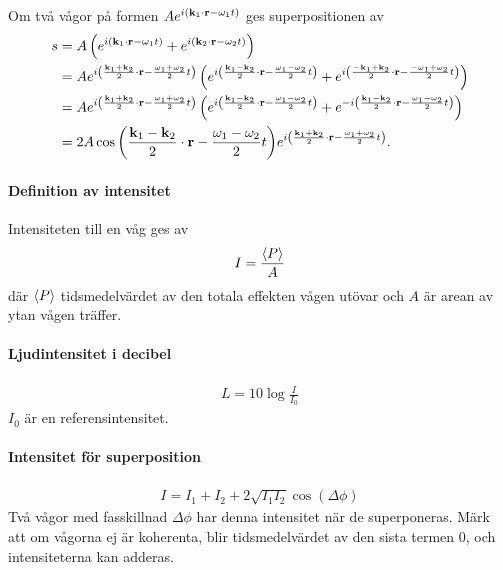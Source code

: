 \deriv
Om två vågor på formen $Ae^{i(\vect{k}_{1}\cdot\vect{r} - \omega_{1} t)}$ ges superpositionen av
\begin{align*}
	s &= A\left(e^{i(\vect{k}_{1}\cdot\vect{r} - \omega_{1} t)} + e^{i(\vect{k}_{2}\cdot\vect{r} - \omega_{2} t)}\right) \\
	  &= Ae^{i\left(\frac{\vect{k}_{1} + \vect{k}_{2}}{2}\cdot\vect{r} - \frac{\omega_{1} + \omega_{2}}{2}t\right)}\left(e^{i\left(\frac{\vect{k}_{1} - \vect{k}_{2}}{2}\cdot\vect{r} - \frac{\omega_{1} - \omega_{2}}{2}t\right)} + e^{i\left(\frac{-\vect{k}_{1} + \vect{k}_{2}}{2}\cdot\vect{r} - \frac{-\omega_{1} + \omega_{2}}{2}t\right)}\right) \\
	  &= Ae^{i\left(\frac{\vect{k}_{1} + \vect{k}_{2}}{2}\cdot\vect{r} - \frac{\omega_{1} + \omega_{2}}{2}t\right)}\left(e^{i\left(\frac{\vect{k}_{1} - \vect{k}_{2}}{2}\cdot\vect{r} - \frac{\omega_{1} - \omega_{2}}{2}t\right)} + e^{-i\left(\frac{\vect{k}_{1} - \vect{k}_{2}}{2}\cdot\vect{r} - \frac{\omega_{1} - \omega_{2}}{2}t\right)}\right) \\
	  &= 2A\cos{\left(\frac{\vect{k}_{1} - \vect{k}_{2}}{2}\cdot\vect{r} - \frac{\omega_{1} - \omega_{2}}{2}t\right)}e^{i\left(\frac{\vect{k}_{1} + \vect{k}_{2}}{2}\cdot\vect{r} - \frac{\omega_{1} + \omega_{2}}{2}t\right)}.
\end{align*}

\paragraph{Definition av intensitet}
Intensiteten till en våg ges av
\begin{align*}
	I = \frac{\expval{P}}{A}
\end{align*}
där $\expval{P}$ tidsmedelvärdet av den totala effekten vågen utövar och $A$ är arean av ytan vågen träffer.

\paragraph{Ljudintensitet i decibel}
\begin{align*}
	L = 10\log{\frac{I}{I_0}}
\end{align*}
$I_0$ är en referensintensitet.

\paragraph{Intensitet för superposition}
\begin{align*}
	I = I_1 + I_2 + 2\sqrt{I_1I_2}\cos{(\Delta\phi)}
\end{align*}
Två vågor med fasskillnad $\Delta\phi$ har denna intensitet när de superponeras. Märk att om vågorna ej är koherenta, blir tidsmedelvärdet av den sista termen $0$, och intensiteterna kan adderas.

